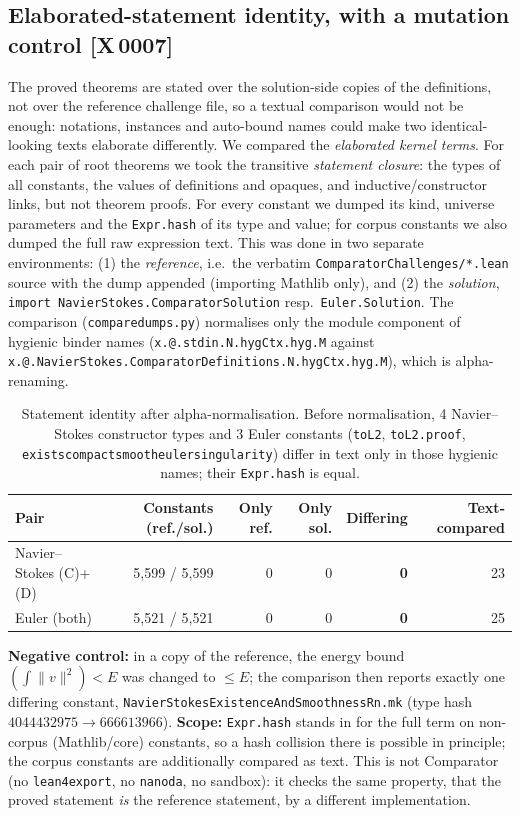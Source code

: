 \documentclass[10pt]{article}
\newcommand{\tg}[2]{\texorpdfstring{\textsf{[#1\,#2]}}{}}  %
\newcommand{\lean}[1]{\texttt{#1}}
\renewcommand{\_}{\textunderscore\allowbreak}
\begin{document}
\subsection{Elaborated-statement identity, with a mutation control \tg{X}{0007}}\label{sec:ident}
The proved theorems are stated over the solution-side copies of the definitions, not over the reference challenge file, so a textual comparison would not be enough: notations, instances and auto-bound names could make two identical-looking texts elaborate differently. We compared the \emph{elaborated kernel terms}.
For each pair of root theorems we took the transitive \emph{statement closure}: the types of all constants, the values of definitions and opaques, and inductive/constructor links, but not theorem proofs. For every constant we dumped its kind, universe parameters and the \lean{Expr.hash} of its type and value; for corpus constants we also dumped the full raw expression text.
This was done in two separate environments: (1) the \emph{reference}, i.e.\ the verbatim \texttt{ComparatorChallenges/*.lean} source with the dump appended (importing Mathlib only), and (2) the \emph{solution}, \lean{import NavierStokes.ComparatorSolution} resp.\ \lean{Euler.Solution}. The comparison (\texttt{compare\_dumps.py}) normalises only the module component of hygienic binder names
(\lean{x.\_@.\_stdin.N.\_hygCtx.\_hyg.M} against \lean{x.\_@.NavierStokes.ComparatorDefinitions.N.\_hygCtx.\_hyg.M}), which is alpha-renaming.
\begin{table}[ht]\centering\small
\begin{tabular}{@{}lrrrrr@{}}
\toprule
Pair & Constants (ref./sol.) & Only ref. & Only sol. & Differing & Text-compared \\ \midrule
Navier--Stokes (C)+(D) & 5,599 / 5,599 & 0 & 0 & \textbf{0} & 23 \\
Euler (both) & 5,521 / 5,521 & 0 & 0 & \textbf{0} & 25 \\ \bottomrule
\end{tabular}
\caption{Statement identity after alpha-normalisation. Before normalisation, 4 Navier--Stokes constructor types and 3 Euler constants (\lean{toL2}, \lean{toL2.\_proof\_3}, \lean{exists\_compact\_smooth\_euler\_singularity}) differ in text only in those hygienic names; their \lean{Expr.hash} is equal.}
\end{table}
\textbf{Negative control:} in a copy of the reference, the energy bound $(\int\|v\|^2)<E$ was changed to $\le E$; the comparison then reports exactly one differing constant, \lean{NavierStokesExistenceAndSmoothnessRn.mk} (type hash $4044432975\to666613966$). \textbf{Scope:} \lean{Expr.hash} stands in for the full term on non-corpus (Mathlib/core) constants, so a hash collision there is possible in principle;
the corpus constants are additionally compared as text. This is not Comparator (no \texttt{lean4export}, no \texttt{nanoda}, no sandbox): it checks the same property, that the proved statement \emph{is} the reference statement, by a different implementation.
\end{document}
